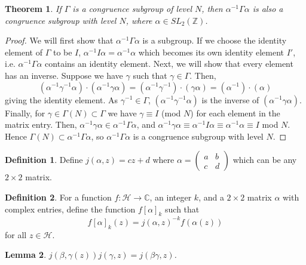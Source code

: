 \documentclass{article}
\newtheorem{theorem}{Theorem}[section]
\newtheorem{lemma}[theorem]{Lemma}
\theoremstyle{definition}
\newtheorem{definition}{Definition}[section]
\theoremstyle{definition}
\theoremstyle{definition}
\newcommand{\Mabcd}{\begin{pmatrix} a&b\\c&d \end{pmatrix}}
\begin{document}
\begin{theorem}
    If $\Gamma$ is a congruence subgroup of level $N$, then $\alpha^{-1}\Gamma\alpha$ is also a congruence subgroup with level $N$, where $\alpha \in SL_2(\mathbb{Z})$.
\end{theorem}

\begin{proof}
  We will first show that $\alpha^{-1}\Gamma\alpha$ is a subgroup. If we choose the identity element of $\Gamma$ to be $I$, $\alpha^{-1}I\alpha= \alpha^{-1}\alpha$ which becomes its own identity element $I'$, i.e. $\alpha^{-1}\Gamma\alpha$ contains an identity element. Next, we will show that every element has an inverse. Suppose we have $\gamma$ such that $\gamma \in \Gamma$. Then, $$(\alpha^{-1}\gamma^{-1}\alpha) \cdot (\alpha^{-1}\gamma\alpha) = (\alpha^{-1}\gamma^{-1}) \cdot (\gamma\alpha)=(\alpha^{-1}) \cdot (\alpha)$$ giving the identity element. As $\gamma^{-1} \in \Gamma$, $(\alpha^{-1}\gamma^{-1}\alpha)$ is the inverse of $(\alpha^{-1}\gamma\alpha)$. Finally, for $\gamma \in \Gamma(N)\subset\Gamma$ we have $\gamma \equiv I$ (mod $N$) for each element in the matrix entry. Then, $\alpha^{-1}\gamma\alpha\in\alpha^{-1}\Gamma\alpha$, and $\alpha^{-1}\gamma\alpha \equiv \alpha^{-1}I\alpha \equiv \alpha^{-1}\alpha \equiv I$ mod $N$. Hence $\Gamma(N)\subset\alpha^{-1}\Gamma\alpha$, so $\alpha^{-1}\Gamma\alpha$ is a congruence subgroup with level $N$.
\end{proof}

\begin{definition}
   Define $j(\alpha,z)=cz+d $ where $\alpha= \Mabcd$ which can be any $2\times2$ matrix.
\end{definition}

\begin{definition}
For a function $f:\mathcal{H}\rightarrow\mathbb{C}$, an integer $k$, and a $2\times2$ matrix $\alpha$ with complex entries, define the function $f[\alpha]_k$ such that
$$f[\alpha]_k(z)=j(\alpha,z)^{-k}f(\alpha(z))$$
for all $z\in\mathcal{H}$.
\end{definition}
    
\begin{lemma} \label{j func result}
$j(\beta,\gamma(z))j(\gamma,z)=j(\beta\gamma,z)$.
\end{lemma}
\end{document}
